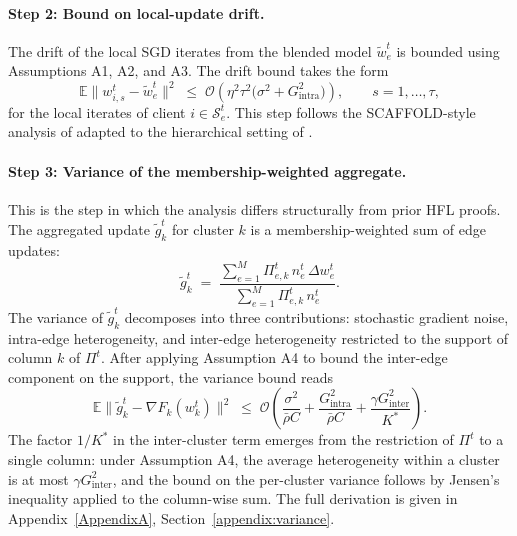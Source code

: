 \paragraph{Step 2: Bound on local-update drift.}
The drift of the local SGD iterates from the blended model $\tilde{w}_{e}^{t}$ is bounded using Assumptions A1, A2, and A3. The drift bound takes the form
\begin{equation}
\label{eq:proof-step2}
\mathbb{E} \big\| w_{i, s}^{t} - \tilde{w}_{e}^{t} \big\|^{2} \;\leq\; \mathcal{O}\!\left( \eta^{2} \tau^{2} \big( \sigma^{2} + G_{\text{intra}}^{2} \big) \right), \qquad s = 1, \ldots, \tau,
\end{equation}
for the local iterates of client $i \in \mathcal{S}_{e}^{t}$. This step follows the SCAFFOLD-style analysis of \cite{karimireddy2020scaffold} adapted to the hierarchical setting of \cite{fang2024hierarchical, jiang2024partial}.

\paragraph{Step 3: Variance of the membership-weighted aggregate.}
This is the step in which the analysis differs structurally from prior HFL proofs. The aggregated update $\tilde{g}_{k}^{t}$ for cluster $k$ is a membership-weighted sum of edge updates:
\begin{equation}
\label{eq:proof-step3a}
\tilde{g}_{k}^{t} \;=\; \frac{ \sum_{e=1}^{M} \Pi_{e,k}^{t} \, n_{e}^{t} \, \Delta w_{e}^{t} }{ \sum_{e=1}^{M} \Pi_{e,k}^{t} \, n_{e}^{t} }.
\end{equation}
The variance of $\tilde{g}_{k}^{t}$ decomposes into three contributions: stochastic gradient noise, intra-edge heterogeneity, and inter-edge heterogeneity restricted to the support of column $k$ of $\Pi^{t}$. After applying Assumption A4 to bound the inter-edge component on the support, the variance bound reads
\begin{equation}
\label{eq:proof-step3b}
\mathbb{E} \big\| \tilde{g}_{k}^{t} - \nabla F_{k}(w_{k}^{t}) \big\|^{2} \;\leq\; \mathcal{O}\!\left( \frac{\sigma^{2}}{\bar{\rho} C} + \frac{G_{\text{intra}}^{2}}{\bar{\rho} C} + \frac{\gamma G_{\text{inter}}^{2}}{K^{*}} \right).
\end{equation}
The factor $1/K^{*}$ in the inter-cluster term emerges from the restriction of $\Pi^{t}$ to a single column: under Assumption A4, the average heterogeneity within a cluster is at most $\gamma G_{\text{inter}}^{2}$, and the bound on the per-cluster variance follows by Jensen's inequality applied to the column-wise sum. The full derivation is given in Appendix~\ref{AppendixA}, Section~\ref{appendix:variance}.

